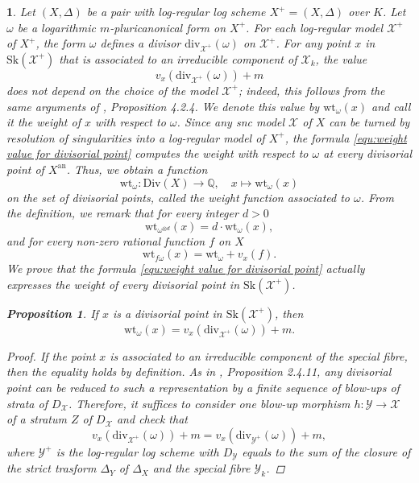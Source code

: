 \documentclass{amsart}%
\numberwithin{equation}{subsection}
\theoremstyle{plain2}
\newtheorem{prop}[equation]{Proposition}
\theoremstyle{definition2}
\theoremstyle{stepstyle}
\theoremstyle{point}
\theoremstyle{subpoint}
\newtheorem{subpoint}[equation]{}%
\newcommand{\spa}[1]{\begin{subpoint}#1\end{subpoint}}           %
\newcommand{\Q}{\ensuremath{\mathbb{Q}}}
\newcommand{\cX}{\ensuremath{\mathscr{X}}}
\newcommand{\cY}{\ensuremath{\mathscr{Y}}}
\renewcommand{\cY}{\ensuremath{\mathscr{Y}}}
\newcommand{\an}{\mathrm{an}}
\newcommand{\divisor}{\mathrm{div}}
\newcommand{\weight}{\mathrm{wt}}
\newcommand{\Sk}{\mathrm{Sk}}
\begin{document}
\spa{Let $(X,\Delta)$ be a pair with log-regular log scheme $X^+=(X,\Delta)$ over $K$. Let $\omega$ be a logarithmic $m$-pluricanonical form on $X^+$. For each log-regular model $\cX^+$ of $X^+$, the form $\omega$ defines a divisor $\divisor_{\cX^+}(\omega)$ on $\cX^+$. For any point $x$ in $\Sk(\cX^+)$ that is associated to an irreducible component of $\cX_k$, the value \begin{equation} \label{equ:weight value for divisorial point}
v_x(\divisor_{\cX^+}(\omega)) +m
\end{equation} does not depend on the choice of the model $\cX^+$; indeed, this follows from the same arguments of \cite{MustataNicaise}, Proposition 4.2.4. We denote this value by $\weight_{\omega}(x)$ and call it the weight of $x$ with respect to $\omega$. Since any snc model $\cX$ of $X$ can be turned by resolution of singularities into a log-regular model of $X^+$, the formula \ref{equ:weight value for divisorial point} computes the weight with respect to $\omega$ at every divisorial point of $X^\an$. Thus, we obtain a function $$\weight_{\omega}: \text{Div}(X) \rightarrow \Q, \quad x \mapsto \weight_{\omega}(x)$$ on the set of divisorial points, called the weight function associated to $\omega$. From the definition, we remark that for every integer $d>0$ $$ \weight_{\omega^{\otimes d} }(x)= d \cdot \weight_{\omega}(x),$$ and for every non-zero rational function $f$ on $X$ $$ \weight_{f\omega}(x)= \weight_{\omega} + v_x(f).$$ We prove that the formula \ref{equ:weight value for divisorial point} actually expresses the weight of every divisorial point in $\Sk(\cX^+)$.

\begin{prop} \label{prop weight function on log regular model}
If $x$ is a divisorial point in $\Sk(\cX^+)$, then $$\weight_{\omega}(x)=v_x(\divisor_{\cX^+}(\omega)) +m.$$
\end{prop}
\begin{proof}
If the point $x$ is associated to an irreducible component of the special fibre, then the equality holds by definition. As in \cite{MustataNicaise}, Proposition 2.4.11, any divisorial point can be reduced to such a representation by a finite sequence of blow-ups of strata of $D_\cX$. Therefore, it suffices to consider one blow-up morphism $h:\cY \rightarrow \cX$ of a stratum $Z$ of $D_\cX$ and check that $$v_x(\divisor_{\cX^+}(\omega)) +m=v_x(\divisor_{\cY^+}(\omega)) +m,$$ where $\cY^+$ is the log-regular log scheme with $D_\cY$ equals to the sum of the closure of the strict trasform $\Delta_Y$ of $\Delta_X$ and the special fibre $\cY_k$.


\end{proof}}
\end{document}
